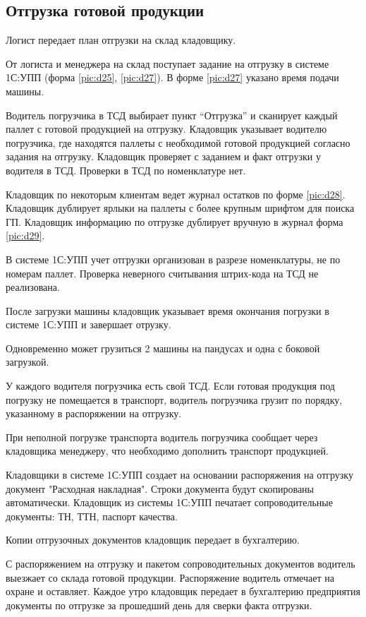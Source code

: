 \newpage
\subsection{Отгрузка готовой продукции}
\label{bp:Shipment}

Логист передает план отгрузки на склад кладовщику. 

От логиста и менеджера на склад поступает  задание на отгрузку в системе 1С:УПП (форма \ref{pic:d25}, 
\ref{pic:d27}).
В форме \ref{pic:d27} указано время подачи машины.

Водитель погрузчика в ТСД выбирает пункт “Отгрузка” и сканирует каждый паллет с готовой продукцией на отгрузку.
Кладовщик указывает  водителю погрузчика, где находятся паллеты с необходимой готовой продукцией согласно задания на отгрузку.
Кладовщик проверяет с заданием и факт отгрузки у водителя в ТСД.
Проверки в ТСД по номенклатуре нет.

Кладовщик по некоторым клиентам ведет журнал остатков по форме \ref{pic:d28}.
Кладовщик дублирует ярлыки на паллеты с более крупным шрифтом для поиска ГП.
Кладовщик информацию по отгрузке дублирует вручную в журнал форма \ref{pic:d29}.

В системе 1С:УПП учет отгрузки организован в разрезе номенклатуры, не по номерам паллет. 
Проверка неверного считывания штрих-кода на ТСД не реализована.

После загрузки машины кладовщик указывает время окончания погрузки в системе 1С:УПП и завершает отрузку.

Одновременно может грузиться 2 машины на пандусах и одна с боковой загрузкой.

У каждого водителя погрузчика есть свой ТСД.
Если готовая продукция под погрузку не помещается в транспорт, водитель погрузчика грузит по порядку, указанному в распоряжении на отгрузку.

При неполной погрузке транспорта водитель погрузчика сообщает через кладовщика менеджеру, что необходимо дополнить транспорт продукцией.


Кладовщики в системе 1С:УПП создает на основании распоряжения на отгрузку документ "Расходная накладная". Строки документа будут скопированы автоматически. Кладовщик из системы 1С:УПП печатает сопроводительные документы: ТН, ТТН, паспорт качества. 

Копии отгрузочных документов кладовщик передает в бухгалтерию.

С распоряжением на отгрузку и пакетом сопроводительных документов водитель выезжает со склада готовой продукции.
Распоряжение водитель отмечает на охране и оставляет. Каждое утро кладовщик передает в бухгалтерию предприятия документы по отгрузке за прошедший день для  сверки факта отгрузки. 

